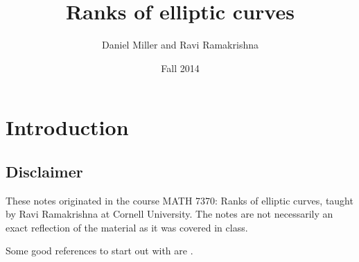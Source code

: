 \documentclass[oneside]{article}
\title{Ranks of elliptic curves}
\author{Daniel Miller and Ravi Ramakrishna}
\date{Fall 2014}
\begin{document}
\fontsize{10.5}{12.6} %
\selectfont

\maketitle
\tableofcontents





\section{Introduction}

\subsection{Disclaimer}

These notes originated in the course MATH 7370: Ranks of elliptic curves, 
taught by Ravi Ramakrishna at Cornell University. The notes are not necessarily 
an exact reflection of the material as it was covered in class. 

Some good references to start out with are \cite{bhargava-thesis-i,bhargava-thesis-ii}. 





\newpage
\printbibliography[heading=bibintoc]
\end{document}
